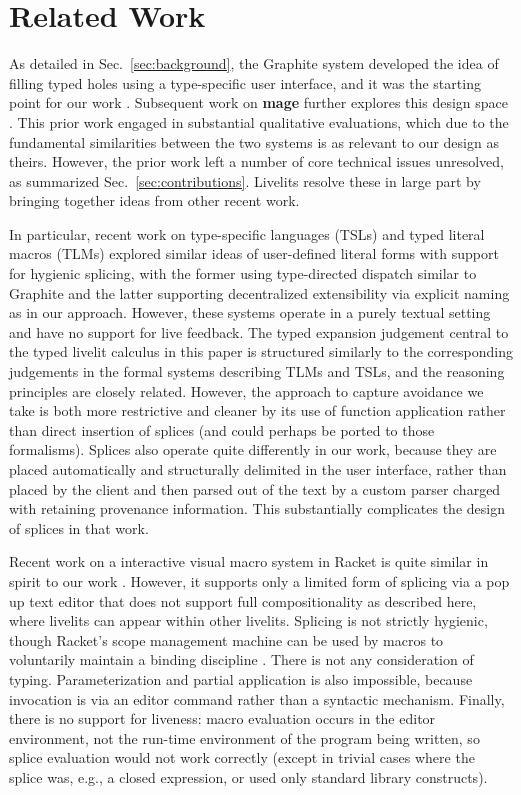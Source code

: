 \section{Related Work}\label{sec:related-work}
As detailed in Sec.~\ref{sec:background},
the Graphite system developed the idea of filling 
typed holes using a type-specific user interface, and it was the starting 
point for our work \cite{Graphite}.
Subsequent work on \textbf{mage} further explores this design space \cite{DBLP:conf/uist/KeryRHMWP20}.
This prior work engaged in substantial qualitative evaluations, 
which due to the fundamental similarities between the two systems 
is as relevant to our design as theirs. However, the prior work 
left a number of core technical issues unresolved,
as summarized Sec.~\ref{sec:contributions}.
Livelits resolve these in large part by bringing together  ideas from other recent work.

In particular, recent work on type-specific languages (TSLs) \cite{TSLs} 
and typed literal macros (TLMs) \cite{TLMs}
explored similar ideas of user-defined
literal forms with support for hygienic splicing, with the former 
using type-directed dispatch similar to Graphite and the latter supporting 
decentralized extensibility via explicit naming as in our approach. 
However, these systems operate in a purely 
textual setting and have no support for live feedback.
The typed expansion judgement central to the typed livelit calculus in this paper 
is structured similarly 
to the corresponding judgements in the formal systems describing TLMs and TSLs,
and the reasoning principles are closely related. However, the  
approach to capture avoidance we take is both more restrictive and cleaner by its use of function application 
rather than direct insertion of splices (and could perhaps be ported to those formalisms).
Splices also operate quite differently in our work,
because they are placed automatically and structurally delimited in the user interface, rather than 
placed by the client and then parsed out of the text by a custom parser charged 
with retaining provenance information.
This substantially complicates the design of splices in that work.

Recent work on a interactive visual macro system in Racket 
is quite similar in spirit to our work \cite{interactive-visual-syntax}.
However, it supports only a limited form of splicing via a pop up text editor
that does not support full compositionality as described here, where livelits 
can appear within other livelits. Splicing is not strictly hygienic, though 
Racket's scope management machine can be used by macros to voluntarily 
maintain a binding discipline \cite{DBLP:conf/popl/Flatt16}. There is not any 
consideration of typing. Parameterization and partial application is also impossible, because invocation 
is via an editor command rather than a syntactic mechanism. Finally,
there is no support for liveness: macro evaluation occurs in the editor 
environment, not the run-time environment of the program being written, 
so splice evaluation would not work correctly (except in trivial cases
where the splice was, e.g., a closed expression, or used only standard 
library constructs).

